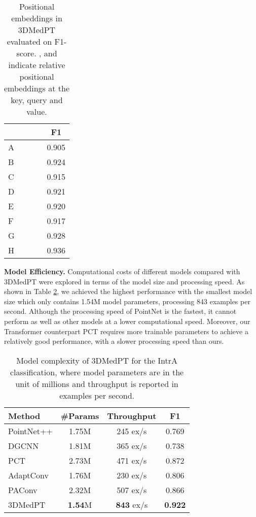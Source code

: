\documentclass[10pt,twocolumn,letterpaper]{article}
\begin{document}
\begin{table}
\small
\centering
\caption{Positional embeddings in 3DMedPT evaluated on F1-score.
,  and  indicate relative positional embeddings at the key, query and value.
}\label{table:ablation}
\begin{tabular}{l|ccc|c}
\toprule
&  &  &  & F1  \\ 
\hline
A &              &              &              & 0.905 \\
B &  &              &              & 0.924 \\
C &              &  &              & 0.915 \\
D &              &              &  & 0.921 \\
E &  &              &  & 0.920 \\
F &              &  &  & 0.917 \\
G &  &  &              & 0.928 \\
H &  &  &  & 0.936 \\
\bottomrule
\end{tabular}
\end{table}

\noindent \textbf{Model Efficiency.}
Computational costs of different models compared with 3DMedPT were explored in terms of the model size and processing speed.
As shown in Table \ref{tab:model_eff}, we achieved the highest performance with the smallest model size which only contains 1.54M model parameters, processing 843 examples per second.
Although the processing speed of PointNet \cite{qi2017pointnet} is the fastest, it cannot perform as well as other models at a lower computational speed.
Moreover, our Transformer counterpart PCT \cite{guo2020pct} requires more trainable parameters to achieve a relatively good performance, with a slower processing speed than ours.



\begin{table}
\centering
\small
\caption{
Model complexity of 3DMedPT for the IntrA classification, where model parameters are in the unit of millions and throughput is reported in examples per second.}
\label{tab:model_eff}
\begin{tabular}{l|cc|c}
\hline
Method            & \#Params  & Throughput & F1 \\
\hline
PointNet++ \cite{qi2017pointnet2}       & 1.75M            & 245 ex/s               & 0.769    \\
DGCNN \cite{wang2019dynamic}            & 1.81M            & 365 ex/s               & 0.738    \\
PCT \cite{guo2020pct}                   & 2.73M            & 471 ex/s               & 0.872    \\
AdaptConv \cite{adapconv}               & 1.76M            & 230 ex/s               & 0.806    \\
PAConv \cite{paconv}                    & 2.32M            & 507 ex/s               & 0.866    \\
3DMedPT                        & \textbf{1.54}M   & \textbf{843} ex/s      & \textbf{0.922}    \\
\hline
\end{tabular}
\end{table}
\end{document}
